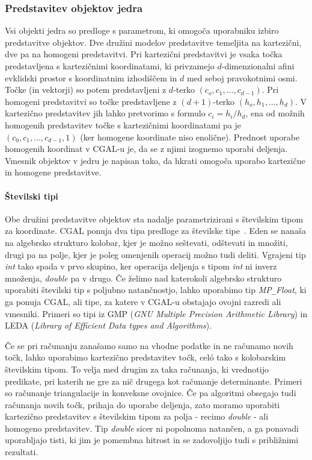 \documentclass[a4paper, 12pt]{book}
\newcommand{\U}{\texttt{\_}}
\begin{document}
\subsubsection{Predstavitev objektov jedra}
Vsi objekti jedra so predloge s parametrom, ki omogoča uporabniku izbiro predstavitve objektov. Dve družini modelov predstavitve temeljita na kartezični, dve pa na homogeni predstavitvi. Pri kartezični predstavitvi je vsaka točka predstavljena s kartezičnimi koordinatami, ki privzamejo $d$-dimenzionalni afini evklidski prostor s koordinatnim izhodiščem in $d$ med seboj pravokotnimi osmi. Točke (in vektorji) so potem predstavljeni z $d$-terko $(c_o, c_1,..., c_{d-1})$. Pri homogeni predstavitvi so točke predstavljene z $(d+1)$-terko $(h_o, h_1,...,h_d)$. V kartezično predstavitev jih lahko pretvorimo s formulo $c_i = h_i/h_d$, ena od možnih homogenih predstavitev točke s kartezičnimi koordinatami pa je $(c_0, c_1,..., c_{d-1}, 1)$ (ker homogene koordinate niso enolične). Prednost uporabe homogenih koordinat v CGAL-u je, da se z njimi izognemo uporabi deljenja. Vmesnik objektov v jedru je napisan tako, da hkrati omogoča uporabo kartezične in homogene predstavitve. 

\paragraph*{Številski tipi}
Obe družini predstavitve objektov sta nadalje parametrizirani s številskim tipom za koordinate. CGAL ponuja dva tipa predloge za številske tipe~\cite{cgal:hhkps-nt-16b}. Eden se nanaša na algebrsko strukturo kolobar, kjer je možno seštevati, odštevati in množiti, drugi pa na polje, kjer je poleg omenjenih operacij možno tudi deliti. Vgrajeni tip \textit{int} tako spada v prvo skupino, ker operacija deljenja s tipom \textit{int} ni inverz množenja, \textit{double} pa v drugo. Če želimo nad katerokoli algebrsko strukturo uporabiti številski tip s poljubno natančnostjo, lahko uporabimo tip \textit{MP\U Float}, ki ga ponuja CGAL, ali tipe, za  katere v CGAL-u obstajajo ovojni razredi ali vmesniki. Primeri so tipi iz GMP (\textit{GNU Multiple Precision Arithmetic Library}) in LEDA (\textit{Library of Efficient Data types and Algorithms}).

\bigbreak
Če se pri računanju zanašamo samo na vhodne podatke in ne računamo novih točk, lahko uporabimo kartezično predstavitev točk, celó tako s kolobarskim številskim tipom. To velja med drugim za taka računanja, ki vrednotijo predikate, pri katerih ne gre za nič drugega kot računanje determinante. Primeri so računanje triangulacije in konveksne ovojnice. Če pa algoritmi obsegajo tudi računanja novih točk, prihaja do uporabe deljenja, zato moramo uporabiti kartezično predstavitev s številskim tipom za polja - recimo \textit{double} - ali homogeno predstavitev. Tip \textit{double} sicer ni popolnoma natančen, a ga ponavadi uporabljajo tisti, ki jim je pomembna hitrost in se zadovoljijo tudi s približnimi rezultati.
\end{document}
